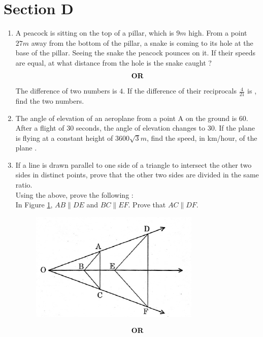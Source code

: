 \documentclass[journal,12pt,twocolumn]{IEEEtran}
\renewcommand\thesection{\arabic{section}}
\begin{document}
\section{Section D}
\renewcommand{\theequation}{\theenumi}
\begin{enumerate}[label=\thesection.\arabic*.,ref=\thesection.\theenumi]
\item A peacock is sitting on the top of a pillar, which is $9 m$ high. From a point $27 m$ away from the bottom of the pillar, a snake is coming to its hole at the base of the pillar. Seeing the snake the peacock pounces on it. If their speeds are equal, at what distance from the hole is the snake caught ?\\
	\begin{align}
		\centering \vec{OR}\nonumber
	\end{align}
The difference of two numbers is $4$. If the difference of their reciprocals $\frac{4}{21}$  is , find the two numbers. \\
\item The angle of elevation of an aeroplane from a point A on the ground is 60\degree. After a flight of $30$ seconds, the angle of elevation changes to 30\degree. If the plane is flying at a constant height of $3600 \sqrt{3} m$, find the speed, in km/hour, of the plane .\\
\item If a line is drawn parallel to one side of a triangle to intersect the other two sides in distinct points, prove that the other two sides are divided in the same ratio.\\
Using the above, prove the following :\\
In Figure \ref{fig5}, $AB\parallel DE$ and $BC \parallel EF$. Prove that $AC \parallel DF$.
\begin{figure}[h!]
	\centering
    \includegraphics[width=0.5\columnwidth, center]{./fig/5.png}
    \caption{}
    \label{fig5}
\end{figure}
\begin{align}
\centering \vec{OR}\nonumber
\end{align}

\end{enumerate}
\end{document}
